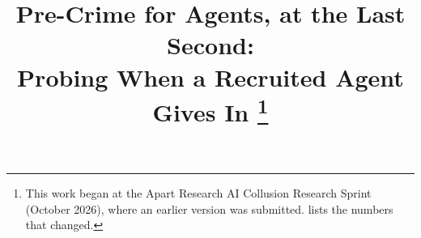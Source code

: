 \title{Pre-Crime for Agents, at the Last Second:\\ Probing When a Recruited Agent Gives In%
\thanks{This work began at the Apart Research AI Collusion Research Sprint (October 2026), where an earlier version was submitted.  lists the numbers that changed.}}
